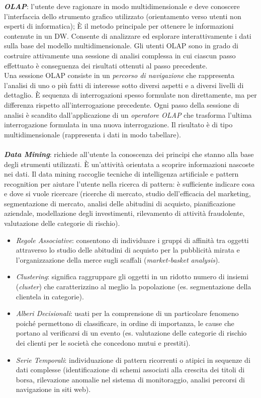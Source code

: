 \documentclass[a4paper, notitlepage, 9pt]{extreport}
\begin{document}
\noindent
\textit{\textbf{OLAP}}: l'utente deve ragionare in modo multidimensionale e deve conoscere l’interfaccia dello strumento grafico utilizzato (orientamento verso utenti non esperti di informatica); \MakeUppercase{è} il metodo principale per ottenere le informazioni contenute in un DW. Consente di analizzare ed esplorare interattivamente i dati sulla base del modello multidimensionale. Gli utenti OLAP sono in grado di costruire attivamente una sessione di analisi complessa in cui ciascun passo effettuato è conseguenza dei risultati ottenuti al passo precedente.\\
Una sessione OLAP consiste in un \textit{percorso di navigazione} che rappresenta l'analisi di uno o più fatti di interesse sotto diversi aspetti e a diversi livelli di dettaglio. \MakeUppercase{è} sequenza di interrogazioni spesso formulate non direttamente, ma per differenza rispetto all’interrogazione precedente. Ogni passo della sessione di analisi è scandito dall’applicazione di un \textit{operatore OLAP} che trasforma l’ultima interrogazione formulata in una nuova interrogazione. Il risultato è di tipo multidimensionale (rappresenta i dati in modo tabellare).
\\\\
\textit{\textbf{Data Mining}}: richiede all’utente la conoscenza dei principi che stanno alla base degli strumenti utilizzati. \MakeUppercase{è} un'attività orientata a scoprire informazioni nascoste nei dati. Il data mining raccoglie tecniche di intelligenza artificiale e pattern recognition per aiutare l’utente nella ricerca di pattern: è sufficiente indicare cosa e dove si vuole ricercare (ricerche di mercato, studio dell'efficacia del marketing, segmentazione di mercato, analisi delle abitudini di acquisto, pianificazione aziendale, modellazione degli investimenti, rilevamento di attività fraudolente, valutazione delle categorie di rischio).
\begin{itemize}
	\item \textit{Regole Associative}: consentono di individuare i gruppi di affinità tra oggetti attraverso lo studio delle abitudini di acquisto per la pubblicità mirata e l’organizzazione della merce sugli scaffali (\textit{market-basket analysis}).
	\item \textit{Clustering}: significa raggruppare gli oggetti in un ridotto numero di insiemi (\textit{cluster}) che caratterizzino al meglio la popolazione (es. segmentazione della
	clientela in categorie).
	\item \textit{Alberi Decisionali}: usati per la comprensione di un particolare fenomeno poiché permettono di classificare, in ordine di importanza, le cause che portano al verificarsi di un evento (es. valutazione delle categorie di rischio dei clienti per le società che concedono mutui e prestiti).\\
	\item \textit{Serie Temporali}: individuazione di pattern ricorrenti o atipici in sequenze di dati complesse (identificazione di schemi associati alla crescita dei titoli di borsa, rilevazione anomalie nel sistema di monitoraggio, analisi percorsi di navigazione in siti web).
	\newline
\end{itemize}
\end{document}
